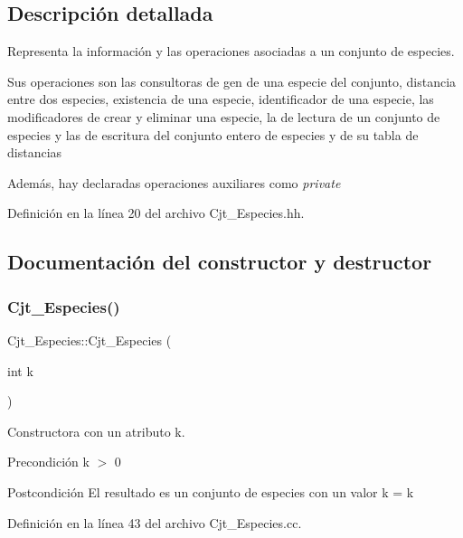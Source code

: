 \subsection{Descripción detallada}
Representa la información y las operaciones asociadas a un conjunto de especies. 

Sus operaciones son las consultoras de gen de una especie del conjunto, distancia entre dos especies, existencia de una especie, identificador de una especie, las modificadores de crear y eliminar una especie, la de lectura de un conjunto de especies y las de escritura del conjunto entero de especies y de su tabla de distancias

Además, hay declaradas operaciones auxiliares como {\itshape private} 

Definición en la línea 20 del archivo Cjt\+\_\+\+Especies.\+hh.



\subsection{Documentación del constructor y destructor}
\mbox{\label{class_cjt___especies_aeb3b22c649a5c8bfd3dfb66178c54338}} 
\subsubsection{\texorpdfstring{Cjt\+\_\+\+Especies()}{Cjt\_Especies()}}
{\footnotesize\ttfamily Cjt\+\_\+\+Especies\+::\+Cjt\+\_\+\+Especies (\begin{DoxyParamCaption}\item[{int}]{k }\end{DoxyParamCaption})}



Constructora con un atributo \textquotesingle{}k\textquotesingle{}. 

\begin{DoxyPrecond}{Precondición}
k $>$ 0 
\end{DoxyPrecond}
\begin{DoxyPostcond}{Postcondición}
El resultado es un conjunto de especies con un valor \textquotesingle{}k\textquotesingle{} = k 
\end{DoxyPostcond}


Definición en la línea 43 del archivo Cjt\+\_\+\+Especies.\+cc.



